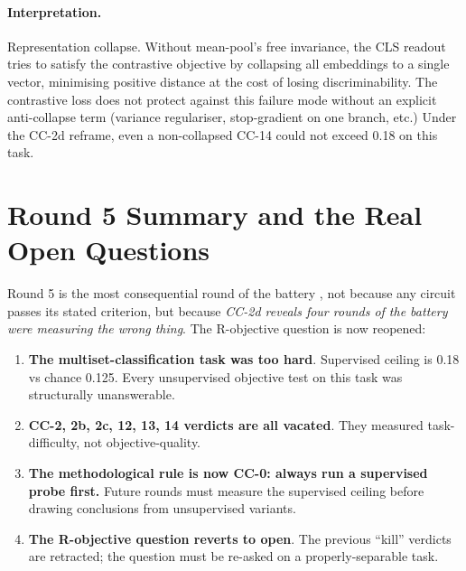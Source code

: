 \documentclass[10pt, twocolumn, a4paper]{article}
\begin{document}
\paragraph{Interpretation.} Representation collapse. Without mean-pool's free invariance, the CLS readout tries to satisfy the contrastive objective by collapsing all embeddings to a single vector, minimising positive distance at the cost of losing discriminability. The contrastive loss does not protect against this failure mode without an explicit anti-collapse term (variance regulariser, stop-gradient on one branch, etc.) Under the CC-2d reframe, even a non-collapsed CC-14 could not exceed 0.18 on this task.


\section{Round 5 Summary and the Real Open Questions}

Round 5 is the most consequential round of the battery ,  not because any circuit passes its stated criterion, but because \emph{CC-2d reveals four rounds of the battery were measuring the wrong thing}. The R-objective question is now reopened:

\begin{enumerate}[nosep,leftmargin=*]
\item \textbf{The multiset-classification task was too hard}. Supervised ceiling is 0.18 vs chance 0.125. Every unsupervised objective test on this task was structurally unanswerable.
\item \textbf{CC-2, 2b, 2c, 12, 13, 14 verdicts are all vacated}. They measured task-difficulty, not objective-quality.
\item \textbf{The methodological rule is now CC-0: always run a supervised probe first.} Future rounds must measure the supervised ceiling before drawing conclusions from unsupervised variants.
\item \textbf{The R-objective question reverts to open}. The previous ``kill'' verdicts are retracted; the question must be re-asked on a properly-separable task.
\end{enumerate}
\end{document}
